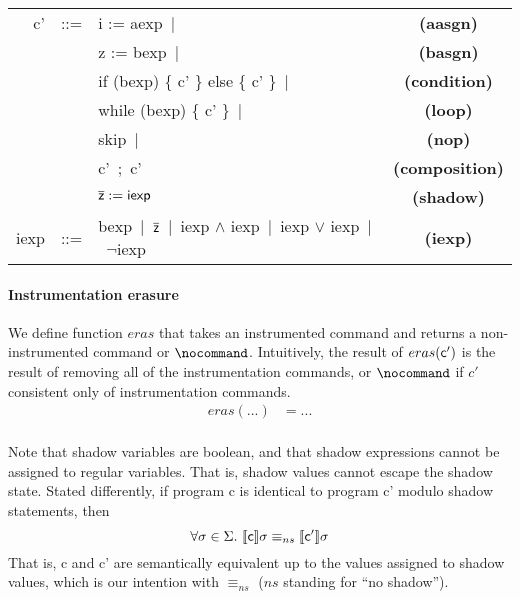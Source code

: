 \documentclass[]{article}
\newcommand{\lsyn}{[\![}
\newcommand{\rsyn}{]\!]}
\begin{document}
\begin{tabular}{rclc}
	{\sf c'} & ::= & {\sf i := aexp}\ $|$ & {\bf (aasgn)}\\
	& 		  & {\sf z := bexp}\ $|$ & {\bf (basgn)} \\
	& 	 & {\sf if (bexp) \{ c' \} else \{ c' \}}\ $|$ & {\bf (condition)}\\
	& 	 & {\sf while (bexp) \{ c' \}}\ $|$ & {\bf (loop)}\\
			 		 & 	 & {\sf skip}\ $|$ & {\bf (nop)}\\
	& 	 & {\sf c'\ ;\ c'} & {\bf (composition)}\\
			 		  &  	  & ${\sf \overline{z} := iexp}$ & {\bf (shadow)} \\
   {\sf iexp}  & ::=  & {\sf bexp}\ $|$\ ${\sf \overline{z}}$\ $|$\
								{\sf iexp} $\wedge$ {\sf iexp}\ $|$\ {\sf iexp} $\vee$ {\sf iexp}\ $|$\ $\neg${\sf iexp} & {\bf (iexp)} \\			 		  
\end{tabular}

\newcommand{\instrEras}{\ensuremath{eras}}
\paragraph{Instrumentation erasure} We define function $\instrEras$ that takes an instrumented command and returns a non-instrumented command or $\nocommand$. Intuitively, the result of $\instrEras({\sf c'})$ is the result of removing all of the instrumentation commands, or $\nocommand$ if $c'$ consistent only of instrumentation commands.
\begin{align*}
  \instrEras(...) &= ...\\
\end{align*}

Note that shadow variables are boolean, and that shadow expressions cannot be assigned to regular variables. That is, shadow values cannot escape the shadow state. Stated differently, if program {\sf c} is identical to program {\sf c'} modulo shadow statements, then
$$
	\forall \sigma \in \Sigma.\ \lsyn {\sf c} \rsyn \sigma \equiv_{ns} \lsyn {\sf c'} \rsyn \sigma
$$
That is, {\sf c} and {\sf c'} are semantically equivalent up to the values assigned to shadow values, which is our intention with $\equiv_{ns}$ ($ns$ standing for ``no shadow'').
\end{document}
